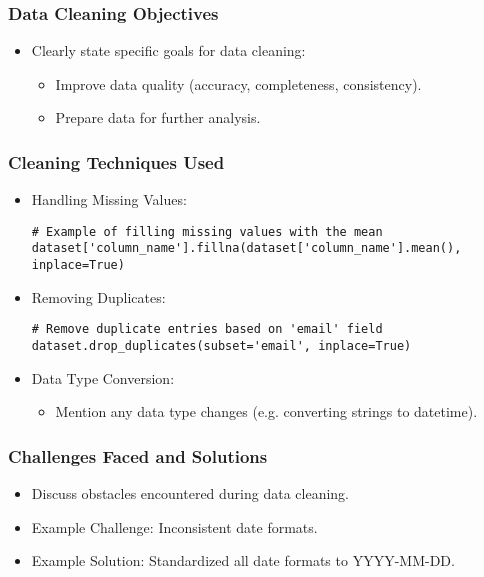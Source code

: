 \documentclass[aspectratio=169]{beamer}
\begin{document}
\begin{frame}
    \frametitle{Data Cleaning Objectives}
    \begin{itemize}
        \item Clearly state specific goals for data cleaning:
        \begin{itemize}
            \item Improve data quality (accuracy, completeness, consistency).
            \item Prepare data for further analysis.
        \end{itemize}
    \end{itemize}
\end{frame}

\begin{frame}[fragile]
    \frametitle{Cleaning Techniques Used}
    \begin{itemize}
        \item Handling Missing Values:
        \begin{lstlisting}
# Example of filling missing values with the mean
dataset['column_name'].fillna(dataset['column_name'].mean(), inplace=True)
        \end{lstlisting}
        \item Removing Duplicates:
        \begin{lstlisting}
# Remove duplicate entries based on 'email' field
dataset.drop_duplicates(subset='email', inplace=True)
        \end{lstlisting}
        \item Data Type Conversion:
        \begin{itemize}
            \item Mention any data type changes (e.g. converting strings to datetime).
        \end{itemize}
    \end{itemize}
\end{frame}

\begin{frame}
    \frametitle{Challenges Faced and Solutions}
    \begin{itemize}
        \item Discuss obstacles encountered during data cleaning.
        \item Example Challenge: Inconsistent date formats.
        \item Example Solution: Standardized all date formats to YYYY-MM-DD.
    \end{itemize}
\end{frame}
\end{document}
